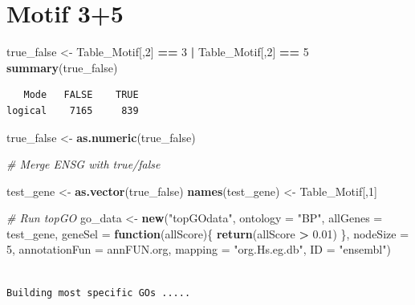 \documentclass[]{article}
\newenvironment{Shaded}{\begin{snugshade}}{\end{snugshade}}
\newcommand{\KeywordTok}[1]{\textcolor[rgb]{0.13,0.29,0.53}{\textbf{#1}}}
\newcommand{\DataTypeTok}[1]{\textcolor[rgb]{0.13,0.29,0.53}{#1}}
\newcommand{\DecValTok}[1]{\textcolor[rgb]{0.00,0.00,0.81}{#1}}
\newcommand{\FloatTok}[1]{\textcolor[rgb]{0.00,0.00,0.81}{#1}}
\newcommand{\StringTok}[1]{\textcolor[rgb]{0.31,0.60,0.02}{#1}}
\newcommand{\CommentTok}[1]{\textcolor[rgb]{0.56,0.35,0.01}{\textit{#1}}}
\newcommand{\ControlFlowTok}[1]{\textcolor[rgb]{0.13,0.29,0.53}{\textbf{#1}}}
\newcommand{\OperatorTok}[1]{\textcolor[rgb]{0.81,0.36,0.00}{\textbf{#1}}}
\newcommand{\NormalTok}[1]{#1}
\begin{document}
\section{Motif 3+5}\label{motif-35}

\begin{Shaded}
\begin{Highlighting}[]
\NormalTok{true_false <-}\StringTok{ }\NormalTok{Table_Motif[,}\DecValTok{2}\NormalTok{] }\OperatorTok{==}\StringTok{ }\DecValTok{3} \OperatorTok{|}\StringTok{ }\NormalTok{Table_Motif[,}\DecValTok{2}\NormalTok{] }\OperatorTok{==}\StringTok{ }\DecValTok{5}
\KeywordTok{summary}\NormalTok{(true_false)}
\end{Highlighting}
\end{Shaded}

\begin{verbatim}
   Mode   FALSE    TRUE 
logical    7165     839 
\end{verbatim}

\begin{Shaded}
\begin{Highlighting}[]
\NormalTok{true_false <-}\StringTok{ }\KeywordTok{as.numeric}\NormalTok{(true_false)}


\CommentTok{# Merge ENSG with true/false}

\NormalTok{test_gene <-}\StringTok{ }\KeywordTok{as.vector}\NormalTok{(true_false)}
\KeywordTok{names}\NormalTok{(test_gene) <-}\StringTok{ }\NormalTok{Table_Motif[,}\DecValTok{1}\NormalTok{]}

\CommentTok{# Run topGO}
\NormalTok{go_data <-}\StringTok{ }\KeywordTok{new}\NormalTok{(}\StringTok{"topGOdata"}\NormalTok{,}
                   \DataTypeTok{ontology =} \StringTok{"BP"}\NormalTok{,}
                   \DataTypeTok{allGenes =}\NormalTok{ test_gene, }
                    \DataTypeTok{geneSel =} \ControlFlowTok{function}\NormalTok{(allScore)\{}
    \KeywordTok{return}\NormalTok{(allScore }\OperatorTok{>}\StringTok{ }\FloatTok{0.01}\NormalTok{)}
\NormalTok{\},}
                   \DataTypeTok{nodeSize =} \DecValTok{5}\NormalTok{,}
                   \DataTypeTok{annotationFun =}\NormalTok{ annFUN.org,}
                   \DataTypeTok{mapping =} \StringTok{"org.Hs.eg.db"}\NormalTok{,}
                   \DataTypeTok{ID =} \StringTok{"ensembl"}\NormalTok{)}
\end{Highlighting}
\end{Shaded}

\begin{verbatim}

Building most specific GOs .....
\end{verbatim}
\end{document}
